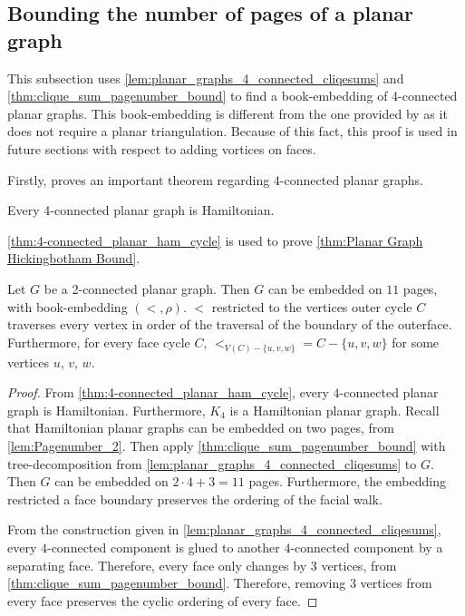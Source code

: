 \subsection{Bounding the number of pages of a planar graph}
This subsection uses \cref{lem:planar_graphs_4_connected_cliqesums} and \cref{thm:clique_sum_pagenumber_bound} to find a book-embedding of 4-connected planar graphs. This book-embedding is different from the one provided by \textcite{yannakakisEmbeddingPlanarGraphs1989} as it does not require a planar triangulation. Because of this fact, this proof is used in future sections with respect to adding vortices on faces. 

Firstly, \textcite{tutteTheoremPlanarGraphs1956} proves an important theorem regarding $4$-connected planar graphs.

\begin{theorem}\label{thm:4-connected_planar_ham_cycle}
	Every 4-connected planar graph is Hamiltonian.
\end{theorem}

\cref{thm:4-connected_planar_ham_cycle} is used to prove \cref{thm:Planar Graph Hickingbotham Bound}.

\begin{corollary}\label{thm:Planar Graph Hickingbotham Bound}
	Let \(G\) be a 2-connected planar graph. Then $G$ can be embedded on $11$ pages, with book-embedding $(<, \rho)$. $<$ restricted to the vertices outer cycle $C$ traverses every vertex in order of the traversal of the boundary of the outerface. Furthermore, for every face cycle $C$, $<_{V(C) - \{u, v, w\}} = C - \{u, v, w\}$ for some vertices $u$, $v$, $w$. 
\end{corollary}
\begin{proof}
	From \cref{thm:4-connected_planar_ham_cycle}, every $4$-connected planar graph is Hamiltonian. Furthermore, $K_4$ is a Hamiltonian planar graph.
	Recall that Hamiltonian planar graphs can be embedded on two pages, from \cref{lem:Pagenumber_2}. 
	Then apply \cref{thm:clique_sum_pagenumber_bound} with tree-decomposition from \cref{lem:planar_graphs_4_connected_cliqesums} to $G$. Then $G$ can be embedded on \(2 \cdot 4 + 3 = 11\) pages. Furthermore, the embedding restricted a face boundary preserves the ordering of the facial walk.

	From the construction given in \cref{lem:planar_graphs_4_connected_cliqesums}, every $4$-connected component is glued to another $4$-connected component by a separating face. Therefore, every face only changes by $3$ vertices, from \cref{thm:clique_sum_pagenumber_bound}. Therefore, removing $3$ vertices from every face preserves the cyclic ordering of every face.
\end{proof}

